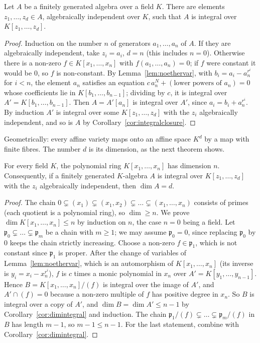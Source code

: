 \begin{theorem}\label{thm:noethernorm}
Let $A$ be a finitely generated algebra over a field $K$. There are elements $z_1,\dots,z_d\in A$, algebraically independent over $K$, such that $A$ is integral over $K[z_1,\dots,z_d]$.
\end{theorem}

\begin{proof}
Induction on the number $n$ of generators $a_1,\dots,a_n$ of $A$. If they are algebraically independent, take $z_i=a_i$, $d=n$ (this includes $n=0$). Otherwise there is a non-zero $f\in K[x_1,\dots,x_n]$ with $f(a_1,\dots,a_n)=0$; if $f$
were constant it would be $0$, so $f$ is non-constant. By Lemma~\ref{lem:noethervar}, with $b_i=a_i-a_n^{r^i}$ for $i<n$, the element $a_n$ satisfies an equation $c\,a_n^N+(\text{lower powers of }a_n)=0$ whose coefficients lie in $K[b_1,\dots,b_{n-1}]$; dividing by $c$, it is integral over
$A'=K[b_1,\dots,b_{n-1}]$. Then $A=A'[a_n]$ is integral over $A'$, since $a_i=b_i+a_n^{r^i}$. By induction $A'$ is integral over some $K[z_1,\dots,z_d]$ with the $z_i$ algebraically independent, and so is $A$ by
Corollary~\ref{cor:integralclosure}.
\end{proof}

Geometrically: every affine variety maps onto an affine space $K^d$ by a map with finite fibres. The number $d$ is its dimension, as the next theorem shows.

\begin{theorem}\label{thm:dimpoly}
For every field $K$, the polynomial ring $K[x_1,\dots,x_n]$ has dimension $n$. Consequently, if a finitely generated $K$-algebra $A$ is integral over $K[z_1,\dots,z_d]$ with the $z_i$ algebraically independent, then $\dim A=d$.
\end{theorem}

\begin{proof}
The chain $0\subsetneq(x_1)\subsetneq(x_1,x_2)\subsetneq\dots\subsetneq(x_1,\dots,x_n)$ consists of primes (each quotient is a polynomial ring), so $\dim\ge n$. We prove $\dim K[x_1,\dots,x_n]\le n$ by induction on $n$, the case $n=0$
being a field. Let $\mathfrak p_0\subsetneq\dots\subsetneq\mathfrak p_m$ be a chain with $m\ge1$; we may assume $\mathfrak p_0=0$, since replacing $\mathfrak p_0$ by $0$ keeps the chain strictly increasing. Choose a non-zero $f\in\mathfrak p_1$, which is not
constant since $\mathfrak p_1$ is proper. After the change of variables of Lemma~\ref{lem:noethervar}, which is an automorphism of $K[x_1,\dots,x_n]$ (its inverse is $y_i=x_i-x_n^{r^i}$), $f$ is $c$ times a monic polynomial in $x_n$
over $A'=K[y_1,\dots,y_{n-1}]$. Hence $B=K[x_1,\dots,x_n]/(f)$ is integral over the image of $A'$, and $A'\cap(f)=0$ because a non-zero multiple of $f$ has positive degree in $x_n$. So $B$ is integral over a copy of $A'$, and
$\dim B=\dim A'\le n-1$ by Corollary~\ref{cor:dimintegral} and induction. The chain $\mathfrak p_1/(f)\subsetneq\dots\subsetneq\mathfrak p_m/(f)$ in $B$ has length $m-1$, so $m-1\le n-1$.
For the last statement, combine with Corollary~\ref{cor:dimintegral}.
\end{proof}

